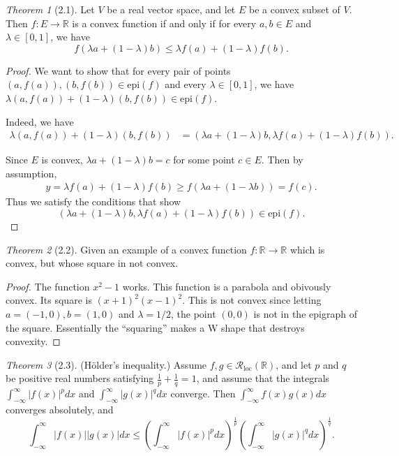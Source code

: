 \documentclass[12pt]{article}
\theoremstyle{remark}
\theoremstyle{named}
\newtheorem*{theorem}{Theorem}
\newcommand{\R}{\mathbb R}
\newcommand{\abs}[1]{|#1|}
\newcommand{\Rloc}{\mathcal R_{\text{loc}}}
\newcommand{\infint}{\int_{-\infty}^{\infty}}
\begin{document}
\begin{theorem}[2.1]
    Let \(V\) be a real vector space, and let \(E\) be a convex subset of \(V\). Then \(f : E \to \R\) is a convex function if and only if for every \(a, b \in E\) and \(\lambda \in [0, 1]\), we have 
    \[f(\lambda a + (1 - \lambda)b) \leq \lambda f(a) + (1 - \lambda) f(b).\]
\end{theorem}

\begin{proof}
    We want to show that for every pair of points \((a, f(a)), (b, f(b)) \in \text{epi}(f)\) and every \(\lambda \in [0, 1]\), we have \(\lambda (a, f(a)) + (1 - \lambda) (b, f(b)) \in \text{epi}(f)\).

    Indeed, we have 
    \begin{align*}
        \lambda (a, f(a)) + (1 - \lambda) (b, f(b)) &= (\lambda a + (1 - \lambda) b, \lambda f(a) + (1 - \lambda) f(b)).
    \end{align*}

    Since \(E\) is convex, \(\lambda a + (1 - \lambda) b = c\) for some point \(c \in E\). Then by assumption, 
    \begin{align*}
        y = \lambda f(a) + (1 - \lambda) f(b) \geq f(\lambda a + (1 - \lambda b)) = f(c).
    \end{align*}
    Thus we satisfy the conditions that show
    \[(\lambda a + (1 - \lambda) b, \lambda f(a) + (1 - \lambda) f(b)) \in \text{epi}(f).\]
\end{proof}

\begin{theorem}[2.2]
    Given an example of a convex function \(f : \R \to \R\) which is convex, but whose square in not convex.
\end{theorem}

\begin{proof}
    The function \(x^2 - 1\) works. This function is a parabola and obivously convex. Its square is \((x + 1)^2 (x - 1)^2\). This is not convex since letting \(a = (-1, 0), b = (1, 0)\) and \(\lambda = 1/2\), the point \((0, 0)\) is not in the epigraph of the square. Essentially the ``squaring'' makes a W shape that destroys convexity.
\end{proof}

\begin{theorem}[2.3]
    (H\"older's inequality.) Assume \(f, g \in \Rloc(\R)\), and let \(p\) and \(q\) be positive real numbers satisfying \(\frac{1}{p} + \frac{1}{q} = 1\), and assume that the integrals \(\infint\abs{f(x)}^p dx\) and \(\infint\abs{g(x)}^q dx\) converge. Then \(\infint f(x) g(x) dx\) converges absolutely, and 
    \[\infint\abs{f(x)}\abs{g(x)} dx \leq \left(\infint \abs{f(x)}^p dx\right)^{\frac{1}{p}} \left(\infint \abs{g(x)}^q dx\right)^{\frac{1}{q}}.\] 
\end{theorem}
\end{document}

